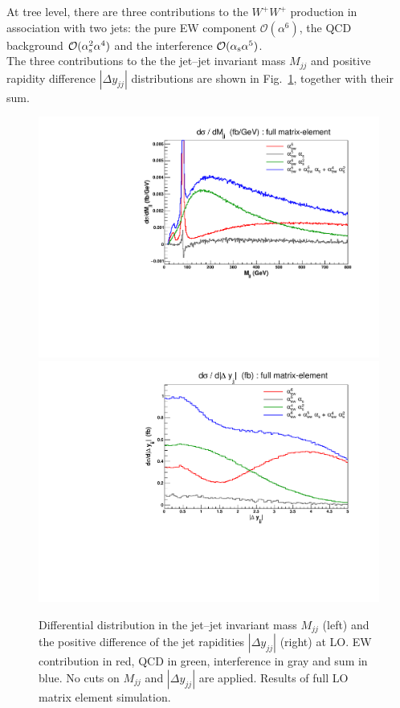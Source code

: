 At tree level, there are three contributions to the $W^+W^+$ production in association with two jets: the pure EW component $\mathcal{O}(\alpha^6)$, the QCD background $\mathcal{O}(\alpha_\text{s}^2\alpha^4)$ and the interference $\mathcal{O}(\alpha_\text{s}\alpha^5)$.\\
The three contributions to the the jet--jet invariant mass $M_{jj}$ and positive rapidity difference $|\Delta y_{jj}|$ distributions are shown in Fig.~\ref{fig:mjjdyjj_1d}, together with their sum.
\begin{figure}[hbt]
\centering
\includegraphics[scale=0.395]{figures/scanfigures/mjj_full.pdf}
\includegraphics[scale=0.395]{figures/scanfigures/dyjj_full.pdf}
\caption{Differential distribution in the jet--jet invariant mass $M_{jj}$ (left) and the positive difference of the jet rapidities $|\Delta y_{jj}|$ (right) at LO. EW contribution in red, QCD in green, interference in gray and sum in blue. No cuts on $M_{jj}$ and $|\Delta y_{jj}|$ are applied. Results of full LO matrix element simulation.}
\label{fig:mjjdyjj_1d}
\end{figure}
